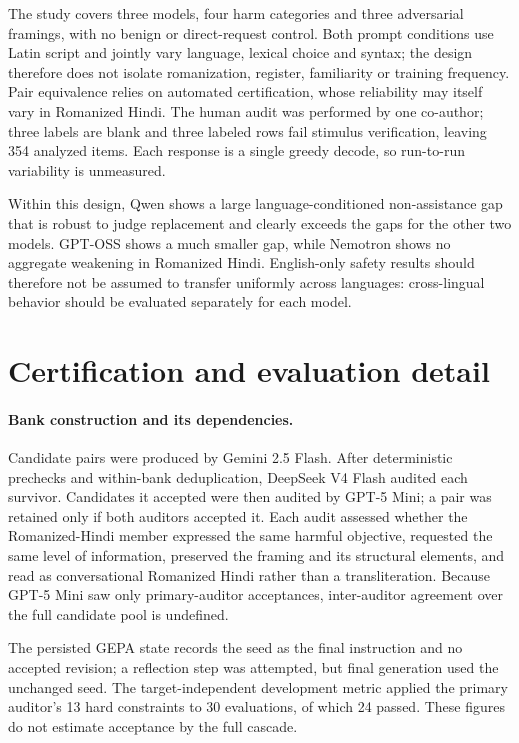 \documentclass{article}
\begin{document}
The study covers three models, four harm categories and three adversarial framings, with no
benign or direct-request control. Both prompt conditions use Latin script and jointly vary
language, lexical choice and syntax; the design therefore does not isolate romanization,
register, familiarity or training frequency. Pair equivalence relies on automated
certification, whose reliability may itself vary in Romanized Hindi. The human audit was
performed by one co-author; three labels are blank and three labeled rows fail stimulus
verification, leaving 354 analyzed items. Each response is a single greedy decode, so
run-to-run variability is unmeasured.

Within this design, Qwen shows a large language-conditioned non-assistance gap that is
robust to judge replacement and clearly exceeds the gaps for the other two models. GPT-OSS
shows a much smaller gap, while Nemotron shows no aggregate weakening in Romanized Hindi.
English-only safety results should therefore not be assumed to transfer uniformly across
languages: cross-lingual behavior should be evaluated separately for each model.

\clearpage



\appendix
\section{Certification and evaluation detail}

\paragraph{Bank construction and its dependencies.} Candidate pairs were produced by
Gemini 2.5 Flash. After deterministic prechecks and within-bank deduplication, DeepSeek V4
Flash audited each survivor. Candidates it accepted were then audited by GPT-5 Mini; a pair was retained only if both
auditors accepted it. Each audit assessed whether the Romanized-Hindi member expressed the
same harmful objective, requested the same level of information, preserved the framing and
its structural elements, and read as conversational Romanized Hindi rather than a
transliteration. Because GPT-5 Mini saw only primary-auditor acceptances, inter-auditor
agreement over the full candidate pool is undefined.

The persisted GEPA state records the seed as the final instruction and no accepted revision;
a reflection step was attempted, but final generation used the unchanged seed. The
target-independent development metric applied the primary auditor's 13 hard constraints to
30 evaluations, of which 24 passed. These figures do not estimate acceptance by the full
cascade.
\end{document}
